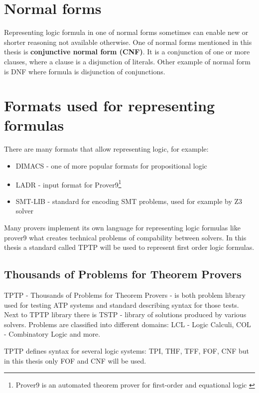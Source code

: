 \section{Normal forms}

Representing logic formula in one of normal forms sometimes can enable new or shorter reasoning not available otherwise. One of normal forms mentioned in this thesis is \textbf{conjunctive normal form (CNF)}. It is a conjunction of one or more clauses, where a clause is a disjunction of literals. Other example of normal form is \gls{DNF} where formula is disjunction of conjunctions.

\section{Formats used for representing formulas}

There are many formats that allow representing logic, for example:

\begin{itemize}
  \item DIMACS - one of more popular formats for propositional logic 
  \item \gls{LADR} - input format for Prover9\footnote{Prover9 is an automated theorem prover for first-order and equational logic \cite{prover9-mace4}}
  \item SMT-LIB \cite{BarFT-RR-17} - standard for encoding \gls{SMT} problems, used for example by Z3 solver
\end{itemize}

Many provers implement its own language for representing logic formulas like prover9 what creates technical problems of compability between solvers. In this thesis a standard called \gls{TPTP} will be used to represent first order logic formulas.

\subsection{Thousands of Problems for Theorem Provers}
\label{sub:TPTP}

TPTP \cite{Sut17} - Thousands of Problems for Theorem Provers - is both problem library used for testing \gls{ATP} systems and standard describing syntax for those tests. Next to TPTP library there is \gls{TSTP} - library of solutions produced by various solvers. Problems are classified into different domains: LCL - Logic Calculi, COL - Combinatory Logic and more.

TPTP defines syntax for several logic systems: \gls{TPI}, \gls{THF}, \gls{TFF}, \gls{FOF}, \gls{CNF} but in this thesis only \gls{FOF} and \gls{CNF} will be used.

